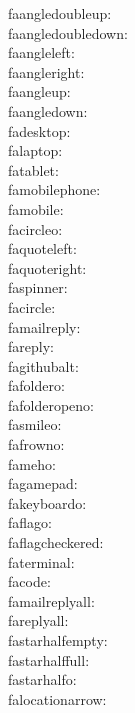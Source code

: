 faangledoubleup: {\FA \faangledoubleup} \\
faangledoubledown: {\FA \faangledoubledown} \\
faangleleft: {\FA \faangleleft} \\
faangleright: {\FA \faangleright} \\
faangleup: {\FA \faangleup} \\
faangledown: {\FA \faangledown} \\
fadesktop: {\FA \fadesktop} \\
falaptop: {\FA \falaptop} \\
fatablet: {\FA \fatablet} \\
famobilephone: {\FA \famobilephone} \\
famobile: {\FA \famobile} \\
facircleo: {\FA \facircleo} \\
faquoteleft: {\FA \faquoteleft} \\
faquoteright: {\FA \faquoteright} \\
faspinner: {\FA \faspinner} \\
facircle: {\FA \facircle} \\
famailreply: {\FA \famailreply} \\
fareply: {\FA \fareply} \\
fagithubalt: {\FA \fagithubalt} \\
fafoldero: {\FA \fafoldero} \\
fafolderopeno: {\FA \fafolderopeno} \\
fasmileo: {\FA \fasmileo} \\
fafrowno: {\FA \fafrowno} \\
fameho: {\FA \fameho} \\
fagamepad: {\FA \fagamepad} \\
fakeyboardo: {\FA \fakeyboardo} \\
faflago: {\FA \faflago} \\
faflagcheckered: {\FA \faflagcheckered} \\
faterminal: {\FA \faterminal} \\
facode: {\FA \facode} \\
famailreplyall: {\FA \famailreplyall} \\
fareplyall: {\FA \fareplyall} \\
fastarhalfempty: {\FA \fastarhalfempty} \\
fastarhalffull: {\FA \fastarhalffull} \\
fastarhalfo: {\FA \fastarhalfo} \\
falocationarrow: {\FA \falocationarrow} \\
